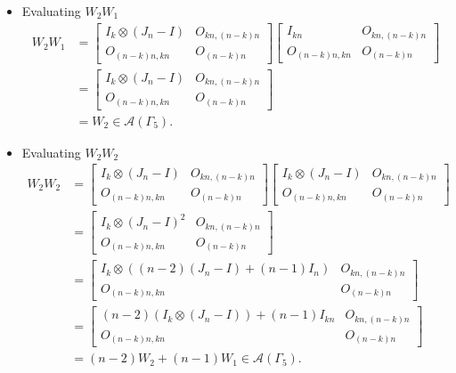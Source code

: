 \begin{itemize}
\item Evaluating $W_{2}W_{1}$
\begin{align*}
W_2W_1 &=
\begin{bmatrix}
I_k \otimes (J_n - I) & O_{kn, (n-k)n} \\
O_{(n-k)n,kn} & O_{(n-k)n}
\end{bmatrix}
\begin{bmatrix}
I_{kn} & O_{kn, (n-k)n} \\
O_{(n-k)n,kn} & O_{(n-k)n}
\end{bmatrix}\\
&= \begin{bmatrix}
I_k \otimes (J_n - I) & O_{kn, (n-k)n} \\
O_{(n-k)n,kn} & O_{(n-k)n}
\end{bmatrix}\\
&= W_2\in\mathcal{A}(\Gamma_5).
\end{align*}

\item Evaluating $W_{2}W_{2}$
\begin{align*}
W_2W_2 &=
\begin{bmatrix}
I_k \otimes (J_n - I) & O_{kn, (n-k)n} \\
O_{(n-k)n,kn} & O_{(n-k)n}
\end{bmatrix}
\begin{bmatrix}
I_k \otimes (J_n - I) & O_{kn, (n-k)n} \\
O_{(n-k)n,kn} & O_{(n-k)n}
\end{bmatrix}\\
&= \begin{bmatrix}
I_k \otimes (J_n - I)^2 & O_{kn, (n-k)n} \\
O_{(n-k)n,kn} & O_{(n-k)n}
\end{bmatrix}\\
&= \begin{bmatrix}
I_k \otimes ((n-2)(J_n - I) + (n-1)I_n) & O_{kn, (n-k)n} \\
O_{(n-k)n,kn} & O_{(n-k)n}  
\end{bmatrix}\\
&= \begin{bmatrix}
(n-2)(I_k \otimes (J_n - I)) + (n-1)I_{kn} & O_{kn, (n-k)n} \\
O_{(n-k)n,kn} & O_{(n-k)n}  
\end{bmatrix}\\
&= (n-2)W_2 + (n-1)W_1 \in\mathcal{A}(\Gamma_5).
\end{align*}


\end{itemize}
